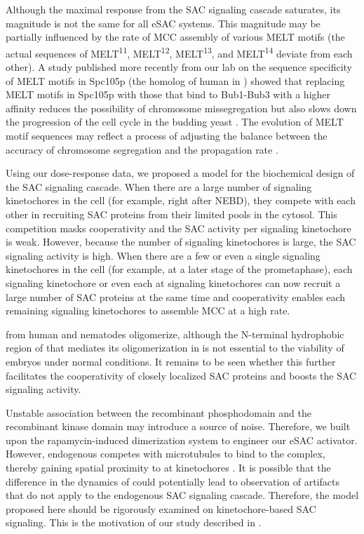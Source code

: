 Although the maximal response from the SAC signaling cascade saturates, its magnitude is not the same for all eSAC systems. This magnitude may be partially influenced by the rate of MCC assembly of various MELT motifs (the actual sequences of MELT\textsuperscript{11}, MELT\textsuperscript{12}, MELT\textsuperscript{13}, and MELT\textsuperscript{14} deviate from each other). A study published more recently from our lab on the sequence specificity of MELT motifs in Spc105p (the homolog of human  in ) showed that replacing MELT motifs in Spc105p with those that bind to Bub1-Bub3 with a higher affinity reduces the possibility of chromosome missegregation but also slows down the progression of the cell cycle in the budding yeast \cite{YeastMELTSpecificity}. The evolution of MELT motif sequences may reflect a process of adjusting the balance between the accuracy of chromosome segregation and the propagation rate \cite{MELTEvolution}.

Using our dose-response data, we proposed a model for the biochemical design of the SAC signaling cascade. When there are a large number of signaling kinetochores in the cell (for example, right after NEBD), they compete with each other in recruiting SAC proteins from their limited pools in the cytosol. This competition masks cooperativity and the SAC activity per signaling kinetochore is weak. However, because the number of signaling kinetochores is large, the SAC signaling activity is high. When there are a few or even a single signaling kinetochores in the cell (for example, at a later stage of the prometaphase), each signaling kinetochore or even each  at signaling kinetochores can now recruit a large number of SAC proteins at the same time and cooperativity enables each remaining signaling kinetochores to assemble MCC at a high rate.

 from human and nematodes \cite{WormKnl1Oligomer,Knl1CTer} oligomerize, although the N-terminal hydrophobic region of  that mediates its oligomerization in  is not essential to the viability of embryos under normal conditions. It remains to be seen whether this further facilitates the cooperativity of closely localized SAC proteins and boosts the SAC signaling activity.

Unstable association between the recombinant  phosphodomain and the recombinant  kinase domain may introduce a source of noise. Therefore, we built upon the rapamycin-induced dimerization system to engineer our eSAC activator. However, endogenous  competes with microtubules to bind to the  complex, thereby gaining spatial proximity to  at kinetochores \cite{MPS1Localization_Ji, MPS1Localization_Hiruma}. It is possible that the difference in the dynamics of  could potentially lead to observation of artifacts that do not apply to the endogenous SAC signaling cascade. Therefore, the model proposed here should be rigorously examined on kinetochore-based SAC signaling. This is the motivation of our study described in .

